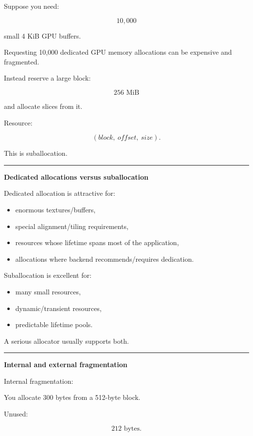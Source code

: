 Suppose you need:

\[
10,000
\]

small 4 KiB GPU buffers.

Requesting 10,000 dedicated GPU memory allocations can be expensive and fragmented.

Instead reserve a large block:

\[
256\text{ MiB}
\]

and allocate slices from it.

Resource:

\[
(block,\ offset,\ size).
\]

This is suballocation.

\begin{center}\rule{0.5\linewidth}{0.5pt}\end{center}

\textbf{Dedicated allocations versus suballocation}

Dedicated allocation is attractive for:

\begin{itemize}
\tightlist
\item
  enormous textures/buffers,
\item
  special alignment/tiling requirements,
\item
  resources whose lifetime spans most of the application,
\item
  allocations where backend recommends/requires dedication.
\end{itemize}

Suballocation is excellent for:

\begin{itemize}
\tightlist
\item
  many small resources,
\item
  dynamic/transient resources,
\item
  predictable lifetime pools.
\end{itemize}

A serious allocator usually supports both.

\begin{center}\rule{0.5\linewidth}{0.5pt}\end{center}

\textbf{Internal and external fragmentation}

Internal fragmentation:

You allocate 300 bytes from a 512-byte block.

Unused:

\[
212\text{ bytes}.
\]

